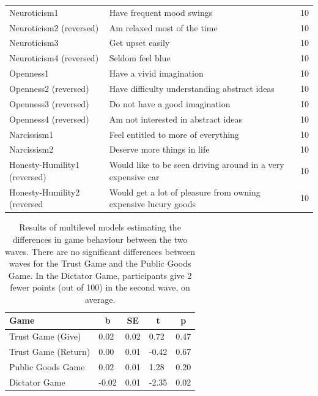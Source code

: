 \documentclass[
  man,floatsintext]{apa6}
\newenvironment{lltable}{\begin{landscape}\centering\begin{ThreePartTable}}{\end{ThreePartTable}\end{landscape}}
\begin{document}
\begin{lltable}
{\begin{longtable}{p{5cm}p{14cm}p{1cm}}
Neuroticism1 & Have frequent mood swings & 10\\
Neuroticism2 (reversed) & Am relaxed most of the time & 10\\
Neuroticism3 & Get upset easily & 10\\
Neuroticism4 (reversed) & Seldom feel blue & 10\\
Openness1 & Have a vivid imagination & 10\\
Openness2 (reversed) & Have difficulty understanding abstract ideas & 10\\
Openness3 (reversed) & Do not have a good imagination & 10\\
Openness4 (reversed) & Am not interested in abstract ideas & 10\\
Narcissism1 & Feel entitled to more of everything & 10\\
Narcissism2 & Deserve more things in life & 10\\
Honesty-Humility1 (reversed) & Would like to be seen driving around in a very expensive car & 10\\
Honesty-Humility2 (reversed & Would get a lot of pleasure from owning expensive lucury goods & 10\\
\bottomrule
\end{longtable}

}

\end{lltable}

\newpage







\begin{table}[H]

\begin{center}
\begin{threeparttable}

\caption{\label{tab:diffTable}Results of multilevel models estimating the differences
in game behaviour between the two waves. There are no significant differences
between waves for the Trust Game and the Public Goods Game. In the Dictator
Game, participants give 2 fewer points (out of 100) in the second wave, on
average.}

\begin{tabular}{lllll}
\toprule
Game & \multicolumn{1}{c}{b} & \multicolumn{1}{c}{SE} & \multicolumn{1}{c}{t} & \multicolumn{1}{c}{p}\\
\midrule
Trust Game (Give) & 0.02 & 0.02 & 0.72 & 0.47\\
Trust Game (Return) & 0.00 & 0.01 & -0.42 & 0.67\\
Public Goods Game & 0.02 & 0.01 & 1.28 & 0.20\\
Dictator Game & -0.02 & 0.01 & -2.35 & 0.02\\
\bottomrule
\end{tabular}

\end{threeparttable}
\end{center}

\end{table}
\end{document}
